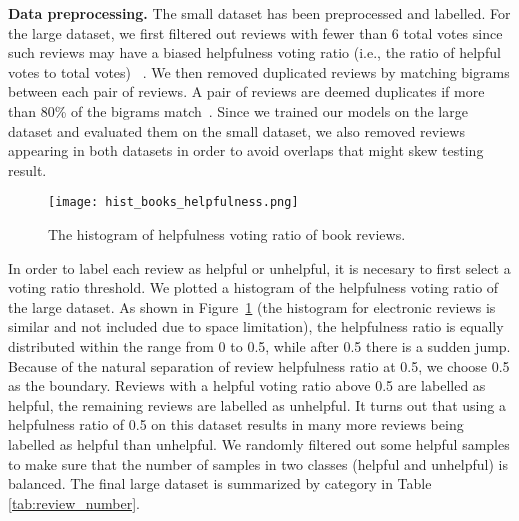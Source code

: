 \documentclass[conference,compsoc]{IEEEtran}
\begin{document}
\textbf{Data preprocessing.} The small dataset has been preprocessed and labelled. For the large dataset, we first filtered out reviews with fewer than 6 total votes since such reviews may have a biased helpfulness voting ratio (i.e., the ratio of helpful votes to total votes) ~\cite{Kim_2006}. We then removed  duplicated reviews by matching bigrams between each pair of reviews. A pair of reviews are deemed duplicates if more than 80\% of the bigrams match~\cite{Kim_2006, Hong_2012}. Since we trained our models on the large dataset and evaluated them on the small dataset, we also removed reviews appearing in both datasets in order to avoid overlaps that might skew testing result. 

\begin{figure}[t]
	\graphicspath{ {./figures/} }
	\centering
	\texttt{[image: hist\_books\_helpfulness.png]}
	\caption{The histogram of helpfulness voting ratio of book reviews.}
	\label{fig:hist_help_ratio}
\end{figure}%

In order to label each review as helpful or unhelpful, it is necesary to first  select a voting ratio threshold. We plotted a histogram of the helpfulness voting ratio of the large dataset. As shown in Figure~\ref{fig:hist_help_ratio} (the histogram for electronic reviews is similar and not included due to space limitation), the helpfulness ratio is equally distributed within the range from 0 to 0.5, while after 0.5 there is a sudden jump. Because of the natural separation of review helpfulness ratio at 0.5, we choose 0.5 as the boundary. Reviews with a helpful voting ratio above 0.5 are labelled as helpful, the remaining reviews are labelled as unhelpful.
It turns out that using a helpfulness ratio of 0.5 on this dataset results in many more reviews being labelled as helpful than unhelpful.
We randomly filtered out some helpful samples to make sure that the number of samples in two classes (helpful and unhelpful) is balanced. The final large dataset is summarized by category in Table \ref{tab:review_number}.
\end{document}
